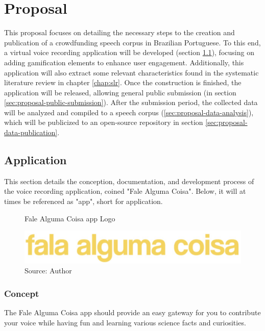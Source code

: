 \chapter[Proposal]{Proposal}

This proposal focuses on detailing the necessary steps to the creation and publication of a crowdfunding speech corpus in Brazilian Portuguese. To this end, a virtual voice recording application will be developed (section \ref{sec:proposal-app}), focusing on adding gamification elements to enhance user engagement. Additionally, this application will also extract some relevant characteristics found in the systematic literature review in chapter \ref{chap:slr}. Once the construction is finished, the application will be released, allowing general public submission (in section \ref{sec:proposal-public-submission}). After the submission period, the collected data will be analyzed and compiled to a speech corpus (\ref{sec:proposal-data-analysis}), which will be publicized to an open-source repository in section \ref{sec:proposal-data-publication}.

\section{Application}
\label{sec:proposal-app}

This section details the conception, documentation, and development process of the voice recording application, coined "Fale Alguma Coisa". Below, it will at times be referenced as "app", short for application.

\begin{figure}[ht]
    \centering
    \caption{Fale Alguma Coisa app Logo}
    \includegraphics[width=\linewidth/2]{images/app/logo.jpg}
    \caption*{Source: Author}
    \label{fig:falealgumacoisa-logo}
\end{figure}

\subsection{Concept}

The Fale Alguma Coisa app should provide an easy gateway for you to contribute your voice while having fun and learning various science facts and curiosities.


